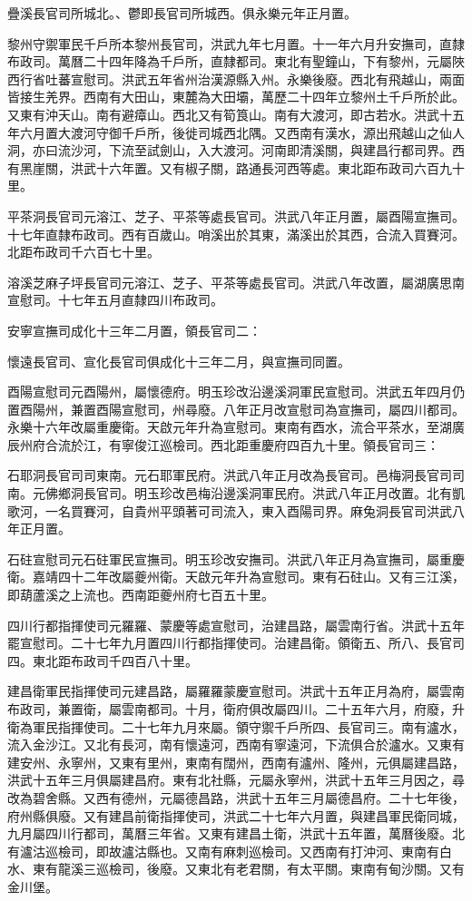 疊溪長官司所城北。、鬱即長官司所城西。俱永樂元年正月置。

黎州守禦軍民千戶所本黎州長官司，洪武九年七月置。十一年六月升安撫司，直隸布政司。萬曆二十四年降為千戶所，直隸都司。東北有聖鐘山，下有黎州，元屬陜西行省吐蕃宣慰司。洪武五年省州治漢源縣入州。永樂後廢。西北有飛越山，兩面皆接生羌界。西南有大田山，東麓為大田壩，萬歷二十四年立黎州土千戶所於此。又東有沖天山。南有避瘴山。西北又有筍筤山。南有大渡河，即古若水。洪武十五年六月置大渡河守御千戶所，後徙司城西北隅。又西南有漢水，源出飛越山之仙人洞，亦曰流沙河，下流至試劍山，入大渡河。河南即清溪關，與建昌行都司界。西有黑崖關，洪武十六年置。又有椒子關，路通長河西等處。東北距布政司六百九十里。

平茶洞長官司元溶江、芝子、平茶等處長官司。洪武八年正月置，屬酉陽宣撫司。十七年直隸布政司。西有百歲山。哨溪出於其東，滿溪出於其西，合流入買賽河。北距布政司千六百七十里。

溶溪芝麻子坪長官司元溶江、芝子、平茶等處長官司。洪武八年改置，屬湖廣思南宣慰司。十七年五月直隸四川布政司。

安寧宣撫司成化十三年二月置，領長官司二：

懷遠長官司、宣化長官司俱成化十三年二月，與宣撫司同置。

酉陽宣慰司元酉陽州，屬懷德府。明玉珍改沿邊溪洞軍民宣慰司。洪武五年四月仍置酉陽州，兼置酉陽宣慰司，州尋廢。八年正月改宣慰司為宣撫司，屬四川都司。永樂十六年改屬重慶衛。天啟元年升為宣慰司。東南有酉水，流合平茶水，至湖廣辰州府合流於江，有寧俊江巡檢司。西北距重慶府四百九十里。領長官司三：

石耶洞長官司司東南。元石耶軍民府。洪武八年正月改為長官司。邑梅洞長官司司南。元佛鄉洞長官司。明玉珍改邑梅沿邊溪洞軍民府。洪武八年正月改置。北有凱歌河，一名買賽河，自貴州平頭著可司流入，東入酉陽司界。麻兔洞長官司洪武八年正月置。

石砫宣慰司元石砫軍民宣撫司。明玉珍改安撫司。洪武八年正月為宣撫司，屬重慶衛。嘉靖四十二年改屬夔州衛。天啟元年升為宣慰司。東有石砫山。又有三江溪，即葫蘆溪之上流也。西南距夔州府七百五十里。

四川行都指揮使司元羅羅、蒙慶等處宣慰司，治建昌路，屬雲南行省。洪武十五年罷宣慰司。二十七年九月置四川行都指揮使司。治建昌衛。領衛五、所八、長官司四。東北距布政司千四百八十里。

建昌衛軍民指揮使司元建昌路，屬羅羅蒙慶宣慰司。洪武十五年正月為府，屬雲南布政司，兼置衛，屬雲南都司。十月，衛府俱改屬四川。二十五年六月，府廢，升衛為軍民指揮使司。二十七年九月來屬。領守禦千戶所四、長官司三。南有瀘水，流入金沙江。又北有長河，南有懷遠河，西南有寧遠河，下流俱合於瀘水。又東有建安州、永寧州，又東有里州，東南有闊州，西南有瀘州、隆州，元俱屬建昌路，洪武十五年三月俱屬建昌府。東有北社縣，元屬永寧州，洪武十五年三月因之，尋改為碧舍縣。又西有德州，元屬德昌路，洪武十五年三月屬德昌府。二十七年後，府州縣俱廢。又有建昌前衛指揮使司，洪武二十七年六月置，與建昌軍民衛同城，九月屬四川行都司，萬曆三年省。又東有建昌土衛，洪武十五年置，萬曆後廢。北有瀘沽巡檢司，即故瀘沽縣也。又南有麻刺巡檢司。又西南有打沖河、東南有白水、東有龍溪三巡檢司，後廢。又東北有老君關，有太平關。東南有甸沙關。又有金川堡。

